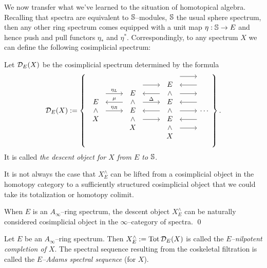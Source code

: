 We now transfer what we've learned to the situation of homotopical algebra.  Recalling that spectra are equivalent to $\S$--modules, $\S$ the usual sphere spectrum, then any other ring spectrum comes equipped with a unit map $\eta: \S \to E$ and hence push and pull functors $\eta_*$ and $\eta^*$.  Correspondingly, to any spectrum $X$ we can define the following cosimplicial spectrum:
\begin{definition}
Let $\sheaf D_E(X)$ be the cosimplicial spectrum determined by the formula
\[\mathcal{D}_E(X) := \left\{
\begin{tikzcd}
\begin{array}{c} E \\ \sm \\ X \end{array} \arrow[leftarrow, shift left=\baselineskip]{r}{\mu} \arrow[shift left=(2*\baselineskip)]{r}{\eta_L} \arrow{r}{\eta_R} &
\begin{array}{c} E \\ \sm \\ E \\ \sm \\ X \end{array} \arrow[shift left=(3*\baselineskip)]{r} \arrow[leftarrow, shift left=(2*\baselineskip)]{r} \arrow[shift left=\baselineskip]{r}{\Delta} \arrow[leftarrow]{r} \arrow[shift right=\baselineskip]{r} &
\begin{array}{c} E \\ \sm \\ E \\ \sm \\ E \\ \sm \\ X \end{array} \arrow[shift left=(4*\baselineskip)]{r} \arrow[leftarrow, shift left=(3*\baselineskip)]{r} \arrow[shift left=(2*\baselineskip)]{r} \arrow[leftarrow, shift left=\baselineskip]{r} \arrow{r} \arrow[leftarrow, shift right=\baselineskip]{r} \arrow[shift right=(2*\baselineskip)]{r} &
\cdots
\end{tikzcd}
\right\}.\]
It is called \textit{the descent object for $X$ from $E$ to $\S$}.
\end{definition}
It is not always the case that $X^\wedge_E$ can be lifted from a cosimplicial object in the homotopy category to a sufficiently structured cosimplicial object that we could take its totalization or homotopy colimit.
\begin{lemma}
When $E$ is an $A_\infty$--ring spectrum, the descent object $X^\wedge_E$ can be naturally considered cosimplicial object in the $\infty$--category of spectra. \qed {}
\end{lemma}
\begin{definition}
Let $E$ be an $A_\infty$--ring spectrum.  Then $X^\wedge_E := \Tot \sheaf D_E(X)$ is called the \textit{$E$--nilpotent completion of $X$}.  The spectral sequence resulting from the coskeletal filtration is called the \textit{$E$--Adams spectral sequence} (for $X$).
\end{definition}

